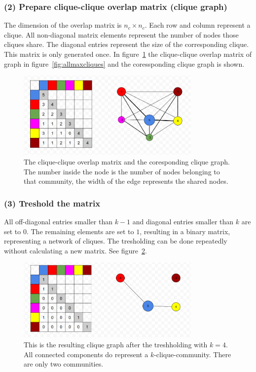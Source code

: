\documentclass[runningheads,a4paper]{llncs}
\begin{document}
\subsubsection{(2) Prepare clique-clique overlap matrix (clique graph)}
The dimension of the overlap matrix is $n_c \times n_c$. Each row and column represent a clique.
All non-diagonal matrix elements represent the number of nodes those cliques share.
The diagonal entries represent the size of the corresponding clique.
This matrix is only generated once.
In figure~\ref{fig:matrix} the clique-clique overlap matrix of graph in figure~\ref{fig:allmaxcliques} and the coressponding clique graph is shown.

\begin{figure}
\begin{center}
	\includegraphics[width=0.8\textwidth]{matrix.png}
		\caption{The clique-clique overlap matrix and the coresponding clique graph. The number inside the node is the number of nodes belonging to that community, the width of the edge represents the shared nodes.}
		\label{fig:matrix}
\end{center}		
\end{figure}


\subsubsection{(3) Treshold the matrix}
All off-diagonal entries smaller than $k-1$ and diagonal entries smaller than $k$ are set to $0$.
The remaining elements are set to $1$, resulting in a binary matrix, representing a network of cliques. The tresholding can be done repeatedly without calculating a new matrix. See figure~\ref{fig:matrixtrashed}.

\begin{figure}
\begin{center}
	\includegraphics[width=0.8\textwidth]{matrixtrashed}
		\caption{This is the resulting clique graph after the treshholding with $k=4$. All connected components do represent a $k$-clique-community. There are only two communities.}
		\label{fig:matrixtrashed}
\end{center}
\end{figure}
 
\end{document}
